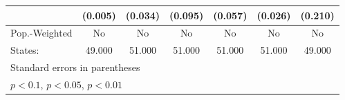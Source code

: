 {\begin{tabular}{l*{6}{c}}
            &     (0.005)         &     (0.034)         &     (0.095)         &     (0.057)         &     (0.026)         &     (0.210)         \\
\hline
Pop.-Weighted&          No         &          No         &          No         &          No         &          No         &          No         \\
States:     &      49.000         &      51.000         &      51.000         &      51.000         &      51.000         &      49.000         \\
\hline\hline
\multicolumn{7}{l}{\footnotesize Standard errors in parentheses}\\
\multicolumn{7}{l}{\footnotesize \sym{*} \(p<0.1\), \sym{**} \(p<0.05\), \sym{***} \(p<0.01\)}\\
\end{tabular}
}
